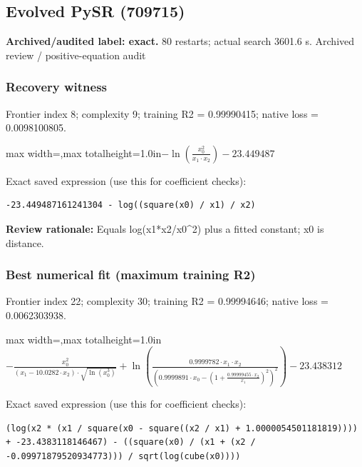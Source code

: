 \documentclass[10pt,letterpaper,landscape]{article}
\begin{document}
\begin{minipage}[t]{0.485\textwidth}
\subsection*{Evolved PySR (709715)}
\textbf{Archived/audited label: exact.} 80 restarts; actual search 3601.6 s.
{\small Archived review / positive-equation audit}
\subsubsection*{Recovery witness}
Frontier index 8; complexity 9; training R2 = 0.99990415; native loss = 0.0098100805.
\begin{center}\begin{adjustbox}{max width=\linewidth,max totalheight=1.0in}$\displaystyle - \ln{\left(\frac{x_{0}^{2}}{x_{1} \cdot x_{2}} \right)} - 23.449487$\end{adjustbox}\end{center}
{\scriptsize Exact saved expression (use this for coefficient checks):}
\begin{lstlisting}
-23.449487161241304 - log((square(x0) / x1) / x2)
\end{lstlisting}
{\small\textbf{Review rationale:} Equals log(x1*x2/x0\textasciicircum{}2) plus a fitted constant; x0 is distance.}
\subsubsection*{Best numerical fit (maximum training R2)}
Frontier index 22; complexity 30; training R2 = 0.99994646; native loss = 0.0062303938.
\begin{center}\begin{adjustbox}{max width=\linewidth,max totalheight=1.0in}$\displaystyle - \frac{x_{0}^{2}}{\left(x_{1} - 10.0282 \cdot x_{2}\right) \cdot \sqrt{\ln{\left(x_{0}^{3} \right)}}} + \ln{\left(\frac{0.9999782 \cdot x_{1} \cdot x_{2}}{\left(0.9999891 \cdot x_{0} - \left(1 + \frac{0.99999455 \cdot x_{2}}{x_{1}}\right)^{2}\right)^{2}} \right)} - 23.438312$\end{adjustbox}\end{center}
{\scriptsize Exact saved expression (use this for coefficient checks):}
\begin{lstlisting}
(log(x2 * (x1 / square(x0 - square((x2 / x1) + 1.0000054501181819)))) + -23.4383118146467) - ((square(x0) / (x1 + (x2 / -0.09971879520934773))) / sqrt(log(cube(x0))))
\end{lstlisting}
\end{minipage}
\clearpage{}\label{newton-10003}
\end{document}
